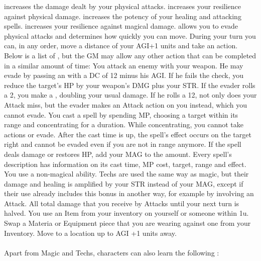  increases the damage dealt by your physical attacks. \ofrow
{} increases your resilience against physical damage. \ofrow
{} increases the potency of your healing and attacking spells. \ofrow
{} increases your resilience against magical damage. \ofrow
{} allows you to evade physical attacks and determines how quickly you can move.
%
\newpage
%
During your turn you can, in any order, move a distance of your AGI+1 units and take an action.
Below is a list of , but the GM may allow any other action that can be completed in a similar amount of time:\ofgap
%
You attack an enemy with your weapon. 
He may evade by passing an  with a DC of 12 minus his AGI. 
If he fails the check, you reduce the target's HP by your weapon's DMG plus your STR.
If the evader rolls a 2, you make a , doubling your usual damage. 
If he rolls a 12, not only does your Attack miss, but the evader makes an Attack action on you instead, which you cannot evade.\ofgap
%
You cast a spell by spending MP, choosing a target within its range and concentrating for a duration.
While concentrating, you cannot take actions or evade. 
After the cast time is up, the spell's effect occurs on the target right  and cannot be evaded even if you are not in range anymore.
If the spell deals damage or restores HP, add your MAG to the amount.
Every spell's description has information on its cast time, MP cost, target, range and effect.\ofgap
%
You use a non-magical ability. 
Techs are used the same way as magic, but their damage and healing is amplified by your STR instead of your MAG, 
except if their use already includes this bonus in another way, for example by involving an Attack.\ofgap
%
 All total damage that you receive by Attacks until your next turn is halved. \ofgap
%
 You use an Item from your inventory on yourself or someone within 1u.\ofgap
%
 Swap a Materia or Equipment piece that you are wearing against one from your Inventory.\ofgap
%
 Move to a location up to AGI +1 units away.\\\\
%
Apart from Magic and Techs, characters can also learn the following : \ofrow
